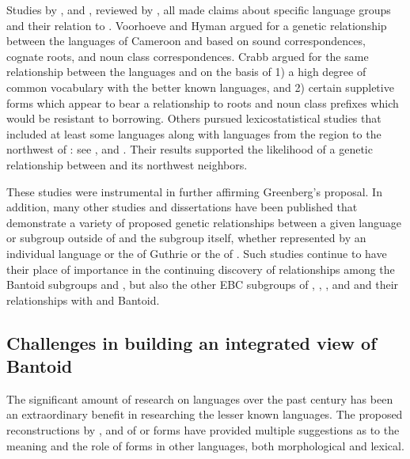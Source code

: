 \documentclass[output=paper]{langsci/langscibook}
\begin{document}
Studies by \citet{Crabb1965,Voorhoeve1971,Hyman1972,Hyman1980borderland,Hyman1980nasalclasses}, and    \citet{HymanVoorhoeve1980}, reviewed by \citet{Watters1982}, all made claims about specific language groups and their relation to .  Voorhoeve and Hyman argued for a genetic relationship between the  languages of Cameroon and  based on sound correspondences, cognate roots, and noun class correspondences.  Crabb argued for the same relationship between the  languages and  on the basis of 1) a high degree of common vocabulary with the better known  languages, and 2) certain suppletive forms which appear to bear a relationship to  roots and noun class prefixes which would be resistant to borrowing.  Others pursued lexicostatistical studies that included at least some  languages along with languages from the region to the northwest of : see \citet{Henrici1973,Heine1973}, and  \citet{CoupezEtAl1975}. Their results supported the likelihood of a genetic relationship between  and its northwest neighbors. 

These studies were instrumental in further affirming Greenberg’s proposal. In  addition, many other studies and dissertations have been published that demonstrate a variety of proposed genetic relationships between a given  language or subgroup outside of   and the  subgroup itself, whether represented by an individual  language or the  of Guthrie or the  of \citet{Meeussen1967}. Such studies continue to have their place of importance in the continuing discovery of relationships among the Bantoid subgroups and , but also the other EBC subgroups of , , , and  and their relationships with  and Bantoid.


\subsection{Challenges in building an integrated view of Bantoid} 


The significant amount of research on  languages over the past century has been an extraordinary benefit in researching the lesser known  languages. The proposed reconstructions by \citet{Guthrie1967,Guthrie1971,Meeussen1967}, and \citet{BastinEtAl2002} of  or  forms have provided multiple suggestions as to the meaning and the role of forms in other  languages, both morphological and lexical. 
\end{document}
